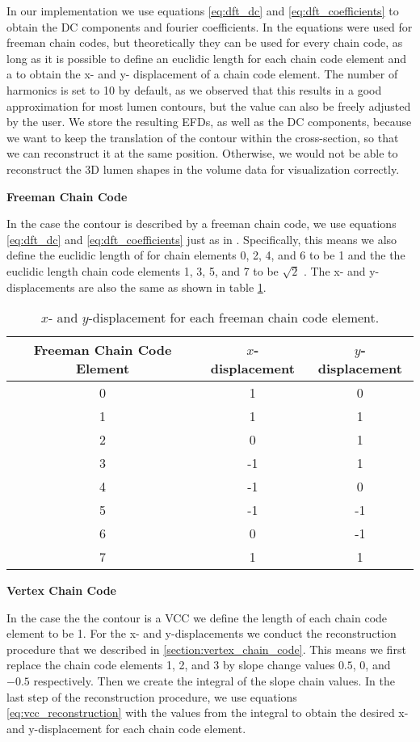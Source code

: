 \documentclass[thesis.tex]{subfiles}
\begin{document}
In our implementation we use equations \ref{eq:dft_dc} and \ref{eq:dft_coefficients} to obtain the DC components and fourier coefficients. In \cite{giardinia} the equations were used for freeman chain codes, but theoretically they can be used for every chain code, as long as it is possible to define an euclidic length for each chain code element and a to obtain the x- and y- displacement of a chain code element. The number of harmonics is set to 10 by default, as we observed that this results in a good approximation for most lumen contours, but the value can also be freely adjusted by the user. We store the resulting EFDs, as well as the DC components, because we want to keep the translation of the contour within the cross-section, so that we can reconstruct it at the same position. Otherwise, we would not be able to reconstruct the 3D lumen shapes in the volume data for visualization correctly.

\textbf{Freeman Chain Code}

In the case the contour is described by a freeman chain code, we use equations \ref{eq:dft_dc} and \ref{eq:dft_coefficients} just as in \cite{giardinia}. Specifically, this means we also define the euclidic length of for chain elements 0, 2, 4, and 6 to be 1 and the the euclidic length chain code elements 1, 3, 5, and 7 to be $\sqrt{2}$ . The x- and y-displacements are also the same as shown in table \ref{table:freeman_displacements}.

\begin{table}[h!]
\centering
 \begin{tabular}{c c c} 
 \toprule
 Freeman Chain Code Element &  $x$-displacement & $y$-displacement\\ [0.5ex] 
\midrule
 0 & 1 & 0 \\ 
 1 & 1 & 1\\
 2 & 0 & 1\\
 3 & -1 & 1\\
 4 & -1 & 0\\
 5 & -1 & -1\\
 6 & 0 & -1\\
 7 & 1 & 1\\
\bottomrule
\end{tabular}
\caption{$x$- and $y$-displacement for each freeman chain code element.}
\label{table:freeman_displacements}
\end{table}

\textbf{ Vertex Chain Code}

In the case the the contour is a VCC we define the length of each chain code element to be 1. For the x- and y-displacements we conduct the reconstruction procedure that we described in \ref{section:vertex_chain_code}. This means we first replace the chain code elements 1, 2, and 3 by slope change values $0.5$, $0$, and $-0.5$ respectively. Then we create the integral of the slope chain values. In the last step of the reconstruction procedure, we use equations \ref{eq:vcc_reconstruction} with the values from the integral to obtain the desired x- and y-displacement for each chain code element.
\end{document}
